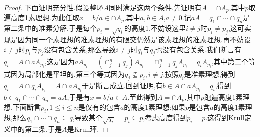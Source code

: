 \begin{enumerate}
\begin{proof}
    	\qquad
    	
    	下面证明充分性.假设整环$A$同时满足这两个条件.先证明有$A=\cap A_p$,其中$p$取遍高度1素理想.为此任取$x=b/a\in\cap A_p$,其中$a,b\in A$,$a\not=0$.记$aA=q_1\cap\cdots\cap q_n$是第二条中的准素分解,于是每个$p_i=\sqrt{q_i}$的高度1.不妨设这里$i\not=j$时$p_i\not=p_j$,这可实现是因为同一个素理想的准素理想的有限交仍然是该素理想的准素理想.再不妨设$i\not=j$时$p_i$与$p_j$没有包含关系,那么导致$i\not=j$时$q_i$与$q_j$也没有包含关系.我们断言有$q_i=A\cap aA_{p_i}$,这是因为$aA_{p_i}=\left(\cap_{j=1}^nq_j\right)A_{p_i}=\cap_{j=1}^nq_jA_{p_i}=q_iA_{p_i}$,其中第二个等式因为局部化是平坦的,第三个等式因为$q_j\not\subseteq p_i,i\not=j$.按照$q_i$是准素理想,得到$q_i=A\cap q_iA_{p_i}=A\cap aA_{p_i}$于是断言成立.回到证明,有$b\in A\cap aA_{p_i}=q_i$,得到$b\in q_1\cap\cdots\cap q_n=aA$,于是有$x=b/a\in A$.至此得到$A=\cap A_p$,其中$p$跑遍高度1素理想.下面断言$p_i,1\le i\le n$是仅有的包含$a$的高度1素理想:如果$p$是包含$a$的高度1素理想,那么$q_1\cap\cdots\cap q_n\subseteq q$,导致某个$\sqrt{q_i}=p_i\subseteq p$,考虑高度得到$p_i=p$.这得到Krull定义中的第二条,于是$A$是Krull环.
    \end{proof}
\end{enumerate}

